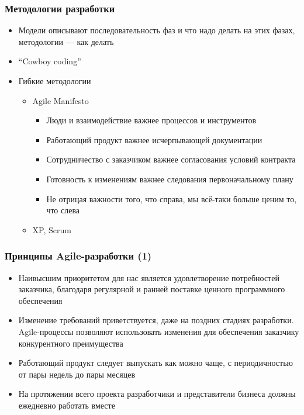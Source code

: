 \documentclass[xetex,mathserif,serif]{beamer}
\begin{document}
    \begin{frame}
        \frametitle{Методологии разработки}
        \begin{itemize}
            \item Модели описывают последовательность фаз и что надо делать на этих фазах, методологии --- как делать
            \item ``Cowboy coding''
            \item Гибкие методологии
            \begin{itemize}
                \item Agile Manifesto
                \begin{itemize}
                    \item Люди и взаимодействие важнее процессов и инструментов
                    \item Работающий продукт важнее исчерпывающей документации
                    \item Сотрудничество с заказчиком важнее согласования условий контракта
                    \item Готовность к изменениям важнее следования первоначальному плану
                    \item Не отрицая важности того, что справа, мы всё-таки больше ценим то, что слева
                \end{itemize}
                \item XP, Scrum
            \end{itemize}
        \end{itemize}
    \end{frame}

    \begin{frame}
        \frametitle{Принципы Agile-разработки (1)}
        \begin{itemize}
            \item Наивысшим приоритетом для нас является удовлетворение потребностей заказчика, благодаря регулярной и ранней поставке ценного программного обеспечения
            \item Изменение требований приветствуется, даже на поздних стадиях разработки. Agile-процессы позволяют использовать изменения для обеспечения заказчику конкурентного преимущества
            \item Работающий продукт следует выпускать как можно чаще, с периодичностью от пары недель до пары месяцев
            \item На протяжении всего проекта разработчики и представители бизнеса должны ежедневно работать вместе
        \end{itemize}
    \end{frame}
\end{document}
